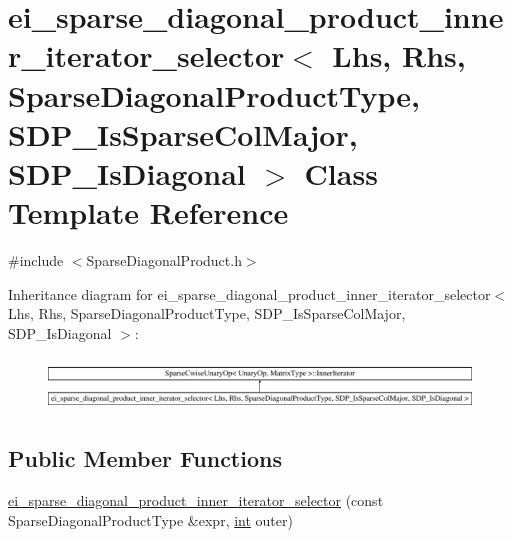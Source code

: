 \hypertarget{classei__sparse__diagonal__product__inner__iterator__selector_3_01_lhs_00_01_rhs_00_01_sparse_di66c92a03f9ab9777b457a0d9ad1f0568}{\section{ei\-\_\-sparse\-\_\-diagonal\-\_\-product\-\_\-inner\-\_\-iterator\-\_\-selector$<$ Lhs, Rhs, Sparse\-Diagonal\-Product\-Type, S\-D\-P\-\_\-\-Is\-Sparse\-Col\-Major, S\-D\-P\-\_\-\-Is\-Diagonal $>$ Class Template Reference}
\label{classei__sparse__diagonal__product__inner__iterator__selector_3_01_lhs_00_01_rhs_00_01_sparse_di66c92a03f9ab9777b457a0d9ad1f0568}
}


{\ttfamily \#include $<$Sparse\-Diagonal\-Product.\-h$>$}

Inheritance diagram for ei\-\_\-sparse\-\_\-diagonal\-\_\-product\-\_\-inner\-\_\-iterator\-\_\-selector$<$ Lhs, Rhs, Sparse\-Diagonal\-Product\-Type, S\-D\-P\-\_\-\-Is\-Sparse\-Col\-Major, S\-D\-P\-\_\-\-Is\-Diagonal $>$\-:\begin{figure}[H]
\begin{center}
\leavevmode
\includegraphics[height=1.396509cm]{classei__sparse__diagonal__product__inner__iterator__selector_3_01_lhs_00_01_rhs_00_01_sparse_di66c92a03f9ab9777b457a0d9ad1f0568}
\end{center}
\end{figure}
\subsection*{Public Member Functions}
\begin{DoxyCompactItemize}
\item 
\hyperlink{classei__sparse__diagonal__product__inner__iterator__selector_3_01_lhs_00_01_rhs_00_01_sparse_di66c92a03f9ab9777b457a0d9ad1f0568_a79841a9bc363da5d97ebdc0e1ec1653f}{ei\-\_\-sparse\-\_\-diagonal\-\_\-product\-\_\-inner\-\_\-iterator\-\_\-selector} (const Sparse\-Diagonal\-Product\-Type \&expr, \hyperlink{ioapi_8h_a787fa3cf048117ba7123753c1e74fcd6}{int} outer)
\end{DoxyCompactItemize}
